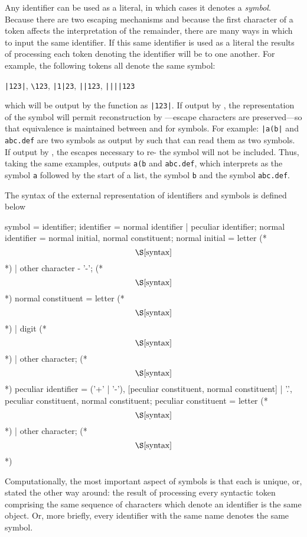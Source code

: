 \begin{optDefinition}
Any identifier can be used as a literal, in which cases it denotes a
{\em symbol}.  Because there are two escaping mechanisms and because
the first character of a token affects the interpretation of the
remainder, there are many ways in which to input the same identifier.
If this same identifier is used as a literal the results of processing
each token denoting the identifier will be  to one another.
For example, the following tokens all denote the same symbol:
%
\begin{center}
\verb+|123|+, \verb+\123+, \verb+|1|23+, \verb+||123+, \verb+||||123+
\end{center}
%
which will be output by the function  as \verb+|123|+.  If
output by , the representation of the symbol will permit
reconstruction by ---escape characters are preserved---so that
equivalence is maintained between  and  for
symbols.  For example: \verb+|a(b|+ and \verb+abc.def+ are two symbols as output
by  such that  can read them as two
symbols.  If output by , the escapes necessary to
re- the symbol will not be included.  Thus, taking the same
examples,  outputs \verb+a(b+ and \verb+abc.def+, which
 interprets as the symbol \verb+a+ followed by the start of a
list, the symbol \verb+b+ and the symbol \verb+abc.def+.

The syntax of the external representation of identifiers and symbols
is defined below

\Syntax
\label{symbol-syntax}
\savesyntax\symbolSyntax\vbox{\small\syntax
symbol
   = identifier;
identifier
    = normal identifier | peculiar identifier;
normal identifier
    = normal initial, {normal constituent};
normal initial
    = letter (* \[\S\ref{syntax}\] *)
    | other character - '-'; (* \[\S\ref{syntax}\] *)
normal constituent
    = letter (* \[\S\ref{syntax}\] *)
    | digit (* \[\S\ref{syntax}\] *)
    | other character; (* \[\S\ref{syntax}\] *)
peculiar identifier
    = ('+' | '-'), [peculiar constituent,
    {normal constituent}]
    | '.', peculiar constituent, {normal constituent};
peculiar constituent
    = letter (* \[\S\ref{syntax}\] *)
    | other character; (* \[\S\ref{syntax}\] *)
\endsyntax}

Computationally, the most important aspect of symbols is that each is
unique, or, stated the other way around: the result of processing
every syntactic token comprising the same sequence of characters which
denote an identifier is the same object.  Or, more briefly, every
identifier with the same name denotes the same symbol.


\end{optDefinition}
